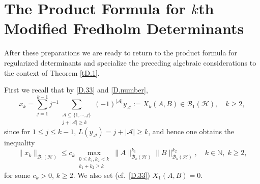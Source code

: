 \documentclass[reqno,10pt,centertags]{amsart}
\newcommand{\bbN}{{\mathbb{N}}}
\newcommand{\cA}{{\mathcal A}}
\newcommand{\cB}{{\mathcal B}}
\newcommand{\cH}{{\mathcal H}}
\newcommand{\lb}{\label}
\let\geq\geqslant
\let\leq\leqslant
\numberwithin{equation}{section}
\theoremstyle{remark}
\begin{document}
\section{The Product Formula for $k$th Modified Fredholm Determinants} \lb{s3}

After these preparations we are ready to return to the product formula for regularized determinants and  specialize the preceding algebraic considerations to the context of
Theorem \ref{tD.1}. 

First we recall that by \eqref{D.33} and \eqref{D.number},  
\begin{equation}
x_k =\sum_{j=1}^{k-1} j^{-1} \sum_{\substack{\cA\subseteq \{1,\cdots,j\}\\ j+|\cA|\geq k}}(-1)^{|\cA|}y_{\cA} := X_k(A,B) \in \cB_1(\cH),  
\quad k \geq 2,
\end{equation} 
since for $1 \leq j \leq k-1$, $L(y_{\cA}) = j+|\cA| \geq k$, and hence one obtains the inequality 
\begin{equation} 
\|x_k\|_{\cB_1(\cH)}\leq c_k\max_{\substack{0\leq k_1,k_2<k\\ k_1+k_2\geq k}} 
\|A\|_{\cB_k(\cH)}^{k_1}\|B\|_{\cB_k(\cH)}^{k_2}, \quad k \in \bbN, \; k \geq 2, 
\end{equation} 
for some $c_k > 0$, $k \geq 2$. We also set (cf.\ \eqref{D.33}) $X_1(A,B) = 0$. 
\end{document}
